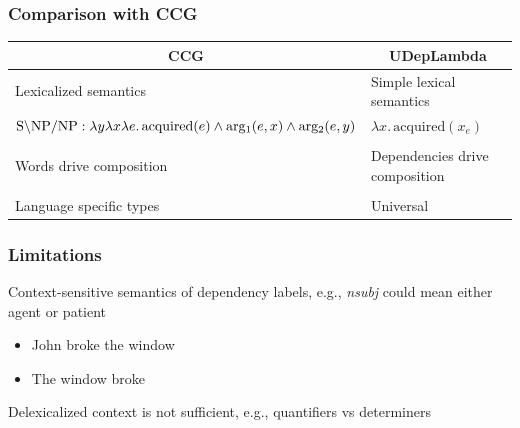 \documentclass[mathserif,12pt]{beamer}
\newcommand{\hlight}[1]{{\color{blue!80} #1}}
\newcommand{\lx}{\lambda x }
\renewcommand{\land}{\wedge}
\newcommand{\lspace}{.\,}
\begin{document}
\begin{frame}
\frametitle{Comparison with CCG}
\large
\vspace{-1em}
\begin{center}
\begin{tabular}{p{5.6cm}|p{5.6cm}}
 \multicolumn{1}{c|}{\hlight{CCG}} & \multicolumn{1}{c}{\hlight{UDepLambda}} \\
 \midrule
 Lexicalized semantics & Simple lexical semantics \\
 \scriptsize $\hbox{S} \backslash \hbox{NP}/ \hbox{NP} : \lambda y \lambda x \lambda e \lspace \mathrm{acquired}(e) \land \mathrm{arg_1}(e, x) \land \mathrm{arg_2}(e, y)$  & \scriptsize $\lx \lspace \mathrm{acquired}(x_e)$ \\ 
\\
 Words drive composition & Dependencies drive composition \\
\\
 Language specific types &  Universal \\
 
\end{tabular}
\end{center}
\end{frame}

\begin{frame}
\frametitle{Limitations}
\Large
Context-sensitive semantics of dependency labels, e.g., \textit{nsubj} could mean either agent or patient
\begin{itemize}
\item John broke the window
\item The window broke
\end{itemize}
\vspace{1em}
Delexicalized context is not sufficient, e.g., quantifiers vs determiners
\end{frame}
\end{document}
